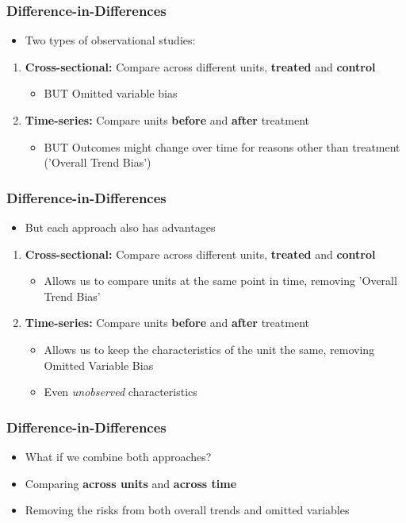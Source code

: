 \documentclass[xcolor=x11names,compress]{beamer}\usepackage[]{graphicx}\usepackage[]{color}
\renewcommand{\(}{\begin{columns}}
\renewcommand{\)}{\end{columns}}
\newcommand{\<}[1]{\begin{column}{#1}}
\renewcommand{\>}{\end{column}}
\begin{document}
\begin{frame}
\frametitle{Difference-in-Differences}
\begin{itemize}
\item Two types of observational studies:
\end{itemize}
\pause
\begin{enumerate}
\item \textbf{Cross-sectional:} Compare across different units, \textbf{treated} and \textbf{control}
\pause
\begin{itemize}
\item BUT Omitted variable bias
\end{itemize}
\pause
\item \textbf{Time-series:} Compare units \textbf{before} and \textbf{after} treatment
\pause
\begin{itemize}
\item BUT Outcomes might change over time for reasons other than treatment ('Overall Trend Bias')
\end{itemize}
\end{enumerate}
\end{frame}

\begin{frame}
\frametitle{Difference-in-Differences}
\begin{itemize}
\item But each approach also has advantages
\end{itemize}
\pause
\begin{enumerate}
\item \textbf{Cross-sectional:} Compare across different units, \textbf{treated} and \textbf{control}
\pause
\begin{itemize}
\item Allows us to compare units at the same point in time, removing 'Overall Trend Bias'
\end{itemize}
\pause
\item \textbf{Time-series:} Compare units \textbf{before} and \textbf{after} treatment
\pause
\begin{itemize}
\item Allows us to keep the characteristics of the unit the same, removing Omitted Variable Bias
\pause
\item Even \textit{unobserved} characteristics
\end{itemize}
\end{enumerate}
\end{frame}

\begin{frame}
\frametitle{Difference-in-Differences}
\begin{itemize}
\item What if we combine both approaches?
\pause
\item Comparing \textbf{across units} and \textbf{across time}
\pause
\item Removing the risks from both overall trends and omitted variables
\end{itemize}
\end{frame}
\end{document}
